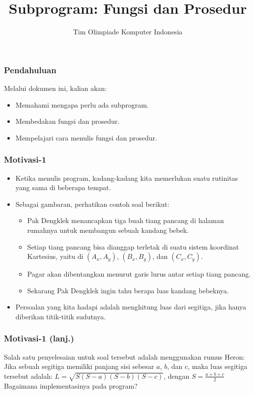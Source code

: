 

\title{Subprogram: \newline Fungsi dan Prosedur}
\author{Tim Olimpiade Komputer Indonesia}
\date{}



\begin{frame}
\titlepage
\end{frame}

\begin{frame}
\frametitle{Pendahuluan}
Melalui dokumen ini, kalian akan:
\begin{itemize}
  \item Memahami mengapa perlu ada subprogram.
  \item Membedakan fungsi dan prosedur.
  \item Mempelajari cara menulis fungsi dan prosedur.
\end{itemize}
\end{frame}

\begin{frame}
\frametitle{Motivasi-1}
\begin{itemize}
  \item Ketika menulis program, kadang-kadang kita memerlukan suatu rutinitas yang sama di beberapa tempat.
  \item Sebagai gambaran, perhatikan contoh soal berikut:
  \begin{itemize}
    \item Pak Dengklek menancapkan tiga buah tiang pancang di halaman rumahnya untuk membangun sebuah kandang bebek.
    \item Setiap tiang pancang bisa dianggap terletak di suatu sistem koordinat Kartesius, yaitu di $(A_x, A_y)$, $(B_x, B_y)$, dan $(C_x, C_y)$.
    \item Pagar akan dibentangkan menurut garis lurus antar setiap tiang pancang.
    \item Sekarang Pak Dengklek ingin tahu berapa luas kandang bebeknya.
  \end{itemize}
  \item Persoalan yang kita hadapi adalah menghitung luas dari segitiga, jika hanya diberikan titik-titik sudutnya.
\end{itemize}
\end{frame}

\begin{frame}
\frametitle{Motivasi-1 (lanj.)}
Salah satu penyelesaian untuk soal tersebut adalah menggunakan rumus Heron:
\newline \newline
Jika sebuah segitiga memiliki panjang sisi sebesar $a$, $b$, dan $c$, maka luas segitiga tersebut adalah:
\newline
$L = \sqrt{S(S-a)(S-b)(S-c)}$, dengan $S = \frac{a+b+c}{2}$
\vfill
Bagaimana implementasinya pada program?
\end{frame}

